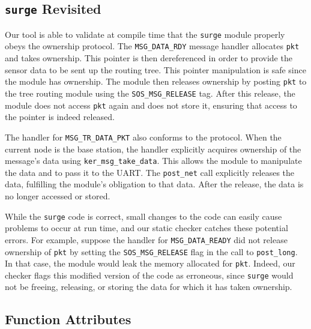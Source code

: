 \subsection{{\tt surge} Revisited}

Our tool is able to validate at compile time that the
{\tt surge} module properly obeys the ownership protocol.
The {\tt MSG\_DATA\_RDY} message handler
allocates {\tt pkt} and takes
ownership. This pointer is then dereferenced in order to provide the
sensor data
to be sent up the routing tree.
This pointer manipulation is safe since the module has ownership.
The module then
releases ownership by posting {\tt pkt} to the tree routing module
using the {\tt SOS\_MSG\_RELEASE} tag.  After this release, the
module does not access
{\tt pkt} again and does not store it, ensuring that access to the
pointer is indeed released. 

The handler for {\tt MSG\_TR\_DATA\_PKT} also conforms to the
protocol.   When the current
node is the base station, the handler explicitly acquires ownership of
the message's data
using {\tt ker\_msg\_take\_data}.  This allows the module to
manipulate the data and to pass it to
the UART.  The {\tt post\_net} call
explicitly releases the data, fulfilling the module's obligation to
that data.   After the release, the data
is no longer accessed or stored.

While the {\tt surge} code is correct, small changes to the code can
easily cause problems to occur at run time, and our static checker
catches these potential errors.  For example, suppose the handler for
{\tt MSG\_DATA\_READY} did not release ownership of {\tt pkt} by setting the 
{\tt SOS\_MSG\_RELEASE} flag in the call to {\tt post\_long}.
In that case, the module would leak the memory allocated for {\tt pkt}.
Indeed, our checker flags this
modified version of the code as erroneous, since {\tt surge} would not be
freeing, releasing, or storing the data for which it has taken ownership.

\subsection{Function Attributes}

